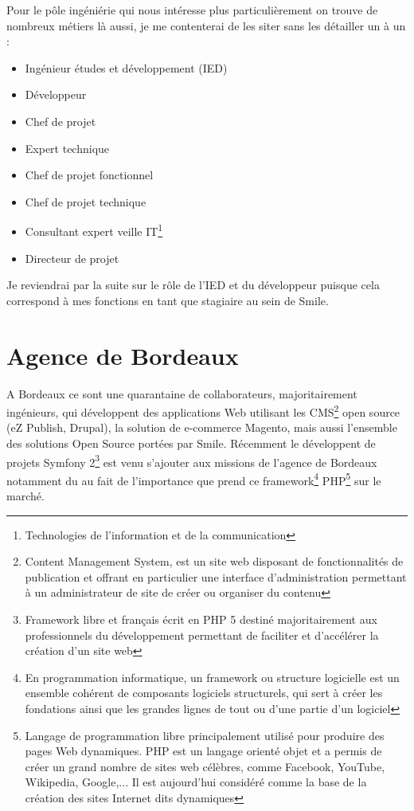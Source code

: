 \documentclass[a4paper,11pt,twoside]{report}
\begin{document}
  Pour le pôle ingéniérie qui nous intéresse plus particulièrement on trouve de nombreux métiers là aussi, je me contenterai de les siter sans les détailler un à un :\newline
  \begin{itemize}

    \item Ingénieur études et développement (IED)
    \item Développeur
    \item Chef de projet
    \item Expert technique
    \item Chef de projet fonctionnel
    \item Chef de projet technique
    \item Consultant expert veille IT\footnote{Technologies de l'information et de la communication}
    \item Directeur de projet
    \newline
    
  \end{itemize}
  
  Je reviendrai par la suite sur le rôle de l'IED et du développeur puisque cela correspond à mes fonctions en tant que stagiaire au sein de Smile.
  
  \section{Agence de Bordeaux}
  A Bordeaux ce sont une quarantaine de collaborateurs, majoritairement ingénieurs, qui développent des applications Web utilisant les CMS\footnote{Content Management System, est un site web disposant de fonctionnalités de publication et offrant en particulier une interface d'administration permettant à un administrateur de site de créer ou organiser du contenu} open source (eZ Publish, Drupal), la solution de e-commerce Magento, mais aussi l’ensemble des solutions Open Source portées par Smile. Récemment le développent de projets Symfony 2\footnote{Framework libre et français écrit en PHP 5 destiné majoritairement aux professionnels du développement permettant de faciliter et d’accélérer la création d'un site web} est venu s'ajouter aux missions de l'agence de Bordeaux notamment du au fait de l'importance que prend ce framework\footnote{En programmation informatique, un framework ou structure logicielle est un ensemble cohérent de composants logiciels structurels, qui sert à créer les fondations ainsi que les grandes lignes de tout ou d’une partie d'un logiciel} PHP\footnote{Langage de programmation libre principalement utilisé pour produire des pages Web dynamiques. PHP est un langage orienté objet et a permis de créer un grand nombre de sites web célèbres, comme Facebook, YouTube, Wikipedia, Google,... Il est aujourd'hui considéré comme la base de la création des sites Internet dits dynamiques} sur le marché.\newline
\end{document}

